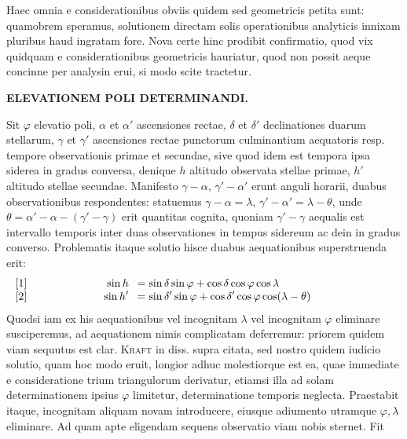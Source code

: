 Haec omnia e considerationibus obviis quidem sed geometricis petita sunt: quamobrem speramus, solutionem directam solis operationibus analyticis innixam pluribus haud ingratam fore. Nova certe hinc prodibit confirmatio, quod vix quidquam e considerationibus geometricis hauriatur, quod non possit aeque concinne per analysin erui, si modo scite tractetur.
\par\clearpage
\noindent{}%
\makebox[12mm][l]{}%
\parbox[t]{\dimexpr\linewidth-24mm\relax}{\centering\fontsize{7.4}{9.2}\selectfont\bfseries ELEVATIONEM POLI DETERMINANDI.\par}%
\par\nobreak\smallskip
{\setlength{\abovedisplayskip}{6pt}
\setlength{\belowdisplayskip}{6pt}
\setlength{\abovedisplayshortskip}{6pt}
\setlength{\belowdisplayshortskip}{6pt}
\newcommand{\GaussVIPoliEquationRow}[4]{%
  \makebox[\linewidth][l]{%
    \makebox[0pt][l]{[#1]}%
    \makebox[#2\linewidth][r]{$\displaystyle #3$}\enspace
    $\displaystyle {}=#4$}%
}
Sit $\varphi$ elevatio poli, $\alpha$ et $\alpha'$ ascensiones rectae, $\delta$ et $\delta'$ declinationes duarum stellarum, $\gamma$ et $\gamma'$ ascensiones rectae punctorum culminantium aequatoris resp. tempore observationis primae et secundae, sive quod idem est tempora ipsa siderea in gradus conversa, denique $h$ altitudo observata stellae primae, $h'$ altitudo stellae secundae. Manifesto $\gamma-\alpha$, $\gamma'-\alpha'$ erunt anguli horarii, duabus observationibus respondentes: statuemus $\gamma-\alpha=\lambda$, $\gamma'-\alpha'=\lambda-\theta$, unde $\theta=\alpha'-\alpha-(\gamma'-\gamma)$ erit quantitas cognita, quoniam $\gamma'-\gamma$ aequalis est intervallo temporis inter duas observationes in tempus sidereum ac dein in gradus converso. Problematis itaque solutio hisce duabus aequationibus superstruenda erit:
\[
\begin{array}{@{}l@{}}
\GaussVIPoliEquationRow{1}{.30}{\sin h}{\sin\delta\sin\varphi+\cos\delta\cos\varphi\cos\lambda}\\
\GaussVIPoliEquationRow{2}{.30}{\sin h'}{\sin\delta'\sin\varphi+\cos\delta'\cos\varphi\cos(\lambda-\theta)}
\end{array}
\]
Quodsi iam ex his aequationibus vel incognitam $\lambda$ vel incognitam $\varphi$ eliminare susciperemus, ad aequationem nimis complicatam deferremur: priorem quidem viam sequutus est clar. \textsc{Kraft} in diss. supra citata, sed nostro quidem iudicio solutio, quam hoc modo eruit, longior adhuc molestiorque est ea, quae immediate e consideratione trium triangulorum derivatur, etiamsi illa ad solam determinationem ipsius $\varphi$ limitetur, determinatione temporis neglecta. Praestabit itaque, incognitam aliquam novam introducere, eiusque adiumento utramque $\varphi,\lambda$ eliminare. Ad quam apte eligendam sequens observatio viam nobis sternet. Fit
}
